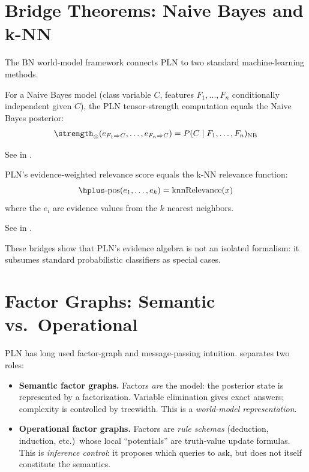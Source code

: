\documentclass[11pt,openany]{report}
\begin{document}
\section{Bridge Theorems: Naive Bayes and k-NN}

The BN world-model framework connects PLN to two standard machine-learning
methods.

\begin{theorem}
\label{thm:nb-bridge}
For a Naive Bayes model (class variable $C$, features $F_1, \ldots, F_n$
conditionally independent given $C$), the PLN tensor-strength computation
equals the Naive Bayes posterior:
\[
  \strength_{\otimes}(e_{F_1 \Rightarrow C}, \ldots, e_{F_n \Rightarrow C})
  = P(C \mid F_1, \ldots, F_n)_{\mathrm{NB}}
\]
\end{theorem}

See  in
.

\begin{theorem}
\label{thm:knn-bridge}
PLN's evidence-weighted relevance score equals the k-NN relevance
function:
\[
  \hplus\text{-}\mathrm{pos}(e_1, \ldots, e_k) = \mathrm{knnRelevance}(x)
\]
where the $e_i$ are evidence values from the $k$ nearest neighbors.
\end{theorem}

See  in
.

These bridges show that PLN's evidence algebra is not an isolated
formalism: it subsumes standard probabilistic classifiers as special
cases.

\section{Factor Graphs: Semantic vs.\ Operational}
\label{sec:factor-graphs}

PLN has long used factor-graph and message-passing intuition.  \xiPLN{}
separates two roles:

\begin{itemize}
\item \textbf{Semantic factor graphs.}  Factors \emph{are} the model:
  the posterior state is represented by a factorization.  Variable
  elimination gives exact answers; complexity is controlled by treewidth.
  This is a \emph{world-model representation}.

\item \textbf{Operational factor graphs.}  Factors are \emph{rule schemas}
  (deduction, induction, etc.)\ whose local ``potentials'' are truth-value
  update formulas.  This is \emph{inference control}: it proposes which
  queries to ask, but does not itself constitute the semantics.
\end{itemize}
\end{document}
